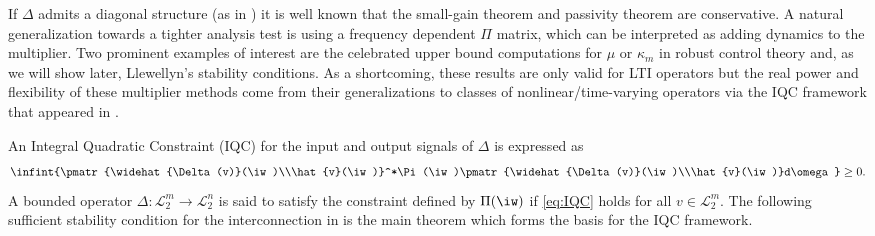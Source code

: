 {If $\Delta$ admits a diagonal structure (as in )} it is well known that the small-gain theorem and passivity theorem are conservative. A natural generalization towards a tighter analysis test is using a frequency dependent $\Pi$ matrix, {which can be interpreted as} adding dynamics to the multiplier.
Two prominent examples of interest are the celebrated upper bound computations for $\mu$ or $\kappa_m$ in robust control theory and, as we will show later, Llewellyn's stability conditions. As a shortcoming, these results are only valid for LTI operators but the real power and flexibility of these multiplier methods come from {their} generalizations to classes of nonlinear/time-varying operators via the IQC framework that appeared in \cite{megretski}.

{An Integral Quadratic Constraint (IQC) for the input and output signals of $\Delta$ is expressed as}
\begin{equation}{\displaystyle\infint{\pmatr{\widehat{\Delta(v)}(\iw)\\\hat{v}(\iw)}^*\Pi(\iw)\pmatr{\widehat{\Delta(v)}(\iw)\\\hat{v}(\iw)}d\omega}} \geq 0.
\label{eq:IQC}
\end{equation}
A bounded operator $\Delta:\mathcal{L}^m_2\to\mathcal{L}^n_2$ is said to satisfy the constraint defined by $\Pi(\iw)$ if \eqref{eq:IQC} holds for all $v\in\mathcal{L}^m_2$.
The following sufficient {stability condition for the interconnection in } is the main theorem which forms the basis for the IQC framework.
